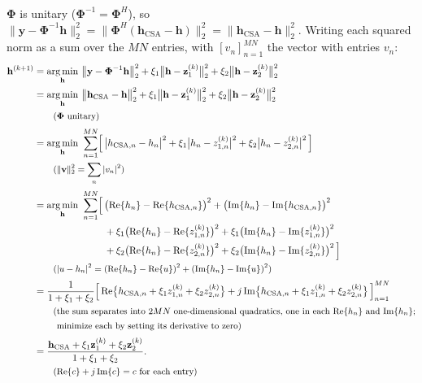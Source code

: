 \documentclass[11pt,a4paper]{article}
\theoremstyle{definition}
\DeclareMathOperator*{\argmin}{arg\,min}
\newcommand{\x}{\mathbf h}
\newcommand{\y}{\mathbf y}
\newcommand{\zo}{\mathbf z_1}
\newcommand{\zt}{\mathbf z_2}
\newcommand{\bPhi}{\boldsymbol\Phi}
\begin{document}
$\bPhi$ is unitary ($\bPhi^{-1} = \bPhi^H$), so $\lVert \y - \bPhi^{-1}\x \rVert_2^2 = \lVert \bPhi^H(\x_{\mathrm{CSA}} - \x) \rVert_2^2 = \lVert \x_{\mathrm{CSA}} - \x \rVert_2^2$.
Writing each squared norm as a sum over the $MN$ entries, with $[v_n]_{n=1}^{MN}$ the vector with entries $v_n$:
\begin{align}
  \x^{(k+1)}
  &= \argmin_{\x}\ \bigl\lVert \y - \bPhi^{-1}\x \bigr\rVert_2^2
     + \xi_1 \bigl\lVert \x - \zo^{(k)} \bigr\rVert_2^2 + \xi_2 \bigl\lVert \x - \zt^{(k)} \bigr\rVert_2^2 \notag \\
  &= \argmin_{\x}\ \bigl\lVert \x_{\mathrm{CSA}} - \x \bigr\rVert_2^2
     + \xi_1 \bigl\lVert \x - \zo^{(k)} \bigr\rVert_2^2 + \xi_2 \bigl\lVert \x - \zt^{(k)} \bigr\rVert_2^2 \notag \\
  &\qquad \text{\small($\bPhi$ unitary)} \notag \\[2pt]
  &= \argmin_{\x}\ \sum_{n=1}^{MN} \Bigl[\, \bigl|h_{\mathrm{CSA},n} - h_n\bigr|^2 + \xi_1 \bigl|h_n - z^{(k)}_{1,n}\bigr|^2 + \xi_2 \bigl|h_n - z^{(k)}_{2,n}\bigr|^2 \,\Bigr] \notag \\
  &\qquad \text{\small($\lVert\mathbf v\rVert_2^2 = \sum_n |v_n|^2$)} \notag \\[2pt]
  &= \argmin_{\x}\ \sum_{n=1}^{MN} \Bigl[\, \bigl(\mathrm{Re}\{h_n\} - \mathrm{Re}\{h_{\mathrm{CSA},n}\}\bigr)^2
       + \bigl(\mathrm{Im}\{h_n\} - \mathrm{Im}\{h_{\mathrm{CSA},n}\}\bigr)^2 \notag \\
  &\hphantom{{}= \argmin_{\x}\ \sum_{n=1}^{MN} \Bigl[\,}
       + \xi_1 \bigl(\mathrm{Re}\{h_n\} - \mathrm{Re}\{z^{(k)}_{1,n}\}\bigr)^2
       + \xi_1 \bigl(\mathrm{Im}\{h_n\} - \mathrm{Im}\{z^{(k)}_{1,n}\}\bigr)^2 \notag \\
  &\hphantom{{}= \argmin_{\x}\ \sum_{n=1}^{MN} \Bigl[\,}
       + \xi_2 \bigl(\mathrm{Re}\{h_n\} - \mathrm{Re}\{z^{(k)}_{2,n}\}\bigr)^2
       + \xi_2 \bigl(\mathrm{Im}\{h_n\} - \mathrm{Im}\{z^{(k)}_{2,n}\}\bigr)^2 \,\Bigr] \notag \\
  &\qquad \text{\small($|u - h_n|^2 = (\mathrm{Re}\{h_n\} - \mathrm{Re}\{u\})^2 + (\mathrm{Im}\{h_n\} - \mathrm{Im}\{u\})^2$)} \notag \\[2pt]
  &= \frac{1}{1+\xi_1+\xi_2} \Bigl[\, \mathrm{Re}\bigl\{h_{\mathrm{CSA},n} + \xi_1 z^{(k)}_{1,n} + \xi_2 z^{(k)}_{2,n}\bigr\}
       + j\, \mathrm{Im}\bigl\{h_{\mathrm{CSA},n} + \xi_1 z^{(k)}_{1,n} + \xi_2 z^{(k)}_{2,n}\bigr\} \,\Bigr]_{n=1}^{MN} \notag \\
  &\qquad \text{\small(the sum separates into $2MN$ one-dimensional quadratics, one in each $\mathrm{Re}\{h_n\}$ and $\mathrm{Im}\{h_n\}$;} \notag \\
  &\qquad \text{\small\phantom{(}minimize each by setting its derivative to zero)} \notag \\[2pt]
  &= \frac{\x_{\mathrm{CSA}} + \xi_1\zo^{(k)} + \xi_2\zt^{(k)}}{1+\xi_1+\xi_2} . \label{eq:xsol} \\
  &\qquad \text{\small($\mathrm{Re}\{c\} + j\,\mathrm{Im}\{c\} = c$ for each entry)} \notag
\end{align}
\end{document}
